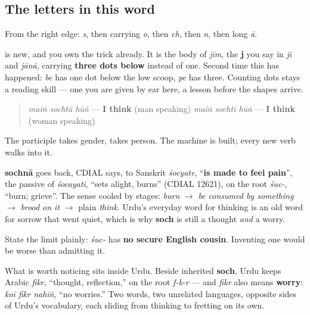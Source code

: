 \subsection*{The letters in this word}
From the right edge: \textbf{} \emph{s}, then \textbf{} carrying \emph{o}, then \textbf{} \emph{ch}, then \textbf{} \emph{n}, then \textbf{} long \emph{ā}.

\textbf{} is new, and you own the trick already. It is the body of \emph{jīm}, the \textbf{j} you say in \emph{jī} and \emph{jānā}, carrying \textbf{three dots below} instead of one. Second time this has happened: \emph{be} has one dot below the low scoop, \emph{pe} has three. Counting dots stays a reading skill — one you are given by ear here, a lesson before the shapes arrive.

\begin{grammarlens}[title={Grammar Lens: nothing new to run it}]
\begin{quote}
\emph{maiṅ sochtā hūṅ} — \textbf{I think} (man speaking) \emph{maiṅ sochtī hūṅ} — \textbf{I think} (woman speaking)
\end{quote}

The participle takes gender, \textbf{} takes person. The machine is built; every new verb walks into it.
\end{grammarlens}

\begin{cousinweb}
\textbf{sochnā} goes back, CDIAL says, to Sanskrit \emph{śocyate}, “\textbf{is made to feel pain}”, the passive of \emph{śocayati}, “sets alight, burns” (CDIAL 12621), on the root \emph{śuc-}, “burn; grieve”. The sense cooled by stages: \emph{burn} $\to$ \emph{be consumed by something} $\to$ \emph{brood on it} $\to$ plain \emph{think}. Urdu's everyday word for thinking is an old word for sorrow that went quiet, which is why \textbf{soch} is still a thought \emph{and} a worry.

State the limit plainly: \emph{śuc-} has \textbf{no secure English cousin}. Inventing one would be worse than admitting it.

What is worth noticing sits inside Urdu. Beside inherited \textbf{soch}, Urdu keeps Arabic \emph{fikr}, “thought, reflection,” on the root \emph{f-k-r} — and \emph{fikr} also means \textbf{worry}: \emph{koī fikr nahīṅ}, “no worries.” Two words, two unrelated languages, opposite sides of Urdu's vocabulary, each sliding from thinking to fretting on its own.
\end{cousinweb}

